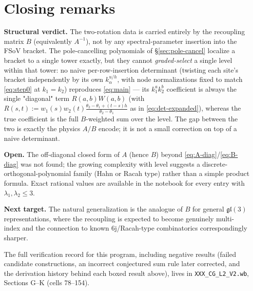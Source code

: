 \documentclass[11pt]{article}
\begin{document}
\section{Closing remarks}
\label{sec:closing}

\textbf{Structural verdict.} The two-rotation data is carried entirely by the recoupling matrix $B$
(equivalently $A^{-1}$), not by any spectral-parameter insertion into the FSoV bracket. The
pole-cancelling polynomials of \S\ref{sec:pole-cancel} localize a bracket to a single tower exactly,
but they cannot \emph{graded-select} a single level within that tower: no naive per-row-insertion
determinant (twisting each site's bracket independently by its own $k_\alpha^{u/h}$, with node
normalizations fixed to match \eqref{eq:step0} at $k_1=k_2$) reproduces \eqref{eq:main} --- its
$k_1^ak_2^b$ coefficient is always the single "diagonal" term $R(a,b)W(a,b)$ (with
$R(s,t):=w_1(s)w_2(t)\frac{\theta_2-\theta_1+(t-s)h}{\theta_2-\theta_1}$ as in
\eqref{eq:det-expanded}), whereas the true coefficient is the full $B$-weighted sum over the level.
The gap between the two is exactly the physics $A/B$ encode; it is not a small correction on top of
a naive determinant.

\textbf{Open.} The off-diagonal closed form of $A$ (hence $B$) beyond \eqref{eq:A-diag}/\eqref{eq:B-diag}
was not found; the growing complexity with level suggests a discrete-orthogonal-polynomial family
(Hahn or Racah type) rather than a simple product formula. Exact rational values are available in
the notebook for every entry with $\lambda_1,\lambda_2\le3$.

\textbf{Next target.} The natural generalization is the analogue of $B$ for general
$\mathfrak{gl}(3)$ representations, where the recoupling is expected to become genuinely
multi-index and the connection to known 6j/Racah-type combinatorics correspondingly sharper.

The full verification record for this program, including negative results (failed candidate
constructions, an incorrect conjectured sum rule later corrected, and the derivation history behind
each boxed result above), lives in \texttt{XXX\_CG\_L2\_V2.wb}, Sections G--K (cells 78--154).
\end{document}

